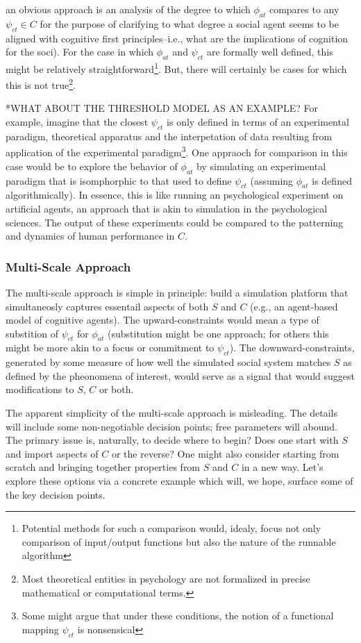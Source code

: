 \documentclass{article}
\begin{document}
an obvious approach is an analysis of the degree to which $\phi_{at}$ compares to any $\psi_{ct} \in C$ for the purpose of clarifying to what degree a social agent seems to be aligned with cognitive first principles--i.e., what are the implications of cognition for the soci).  For the case in which $\phi_{at}$ and $\psi_{ct}$ are formally well defined, this might be relatively straightforward\footnote{Potential methods for such a comparison would, idealy, focus not only comparison of input/output functions but also the nature of the runnable algorithm}.  But, there will certainly be cases for which this is not true\footnote{Most theoretical entities in psychology are not formalized in precise mathematical or computational terms.}.  

*WHAT ABOUT THE THRESHOLD MODEL AS AN EXAMPLE?
For example, imagine that the closest $\psi_{ct}$ is only defined in terms of an experimental paradigm, theoretical apparatus and the interpetation of data resulting from application of the experimental paradigm\footnote{Some might argue that under these conditions, the notion of a functional mapping $\psi_{ct}$ is nonsensical}.  One appraoch for comparison in this case would be to explore the behavior of $\phi_{at}$ by simulating an experimental paradigm that is isomphorphic to that used to define $\psi_{ct}$ (assuming $\phi_{at}$ is defined algorithmically).  In essence, this is like running an psychological experiment on artificial agents, an approach that is akin to simulation in the psychological sciences.  The output of these experiments could be compared to the patterning and dynamics of human performance in $C$.  

 \subsubsection{Multi-Scale Approach}
The multi-scale approach is simple in principle: build a simulation platform that simultaneosly captures essentail aspects of both $S$ and $C$ (e.g., an agent-based model of cognitive agents).  The upward-constraints would mean a type of substition of $\psi_{ct}$ for $\phi_{at}$ (substitution might be one approach; for others this might be more akin to a focus or commitment to $\psi_{ct}$). The downward-constraints, generated by some measure of how well the simulated social system matches $S$ as defined by the pheonomena of interest, would serve as a signal that would suggest modifications to $S$, $C$ or both.  

The apparent simplicity of the multi-scale approach is misleading.  The details will include some non-negotiable decision points; free parameters will abound.  The primary issue is, naturally, to decide where to begin?  Does one start with $S$ and import aspects of $C$ or the reverse?  One might also consider starting from scratch and bringing together properties from $S$ and $C$ in a new way. Let's explore these options via a concrete example which will, we hope, surface some of the key decision points.  
\end{document}

